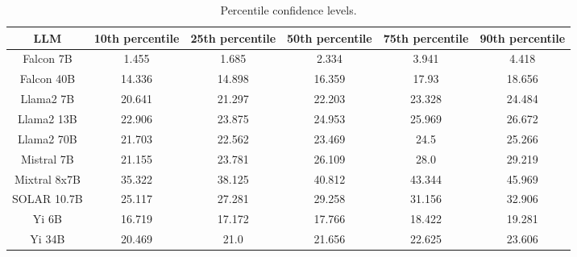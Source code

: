 \begin{table*}
\centering
\begin{tabular}{c|c|c|c|c|c}
LLM & 10th percentile & 25th percentile & 50th percentile & 75th percentile & 90th percentile\\ \hline
Falcon 7B & 1.455 & 1.685 & 2.334 & 3.941 & 4.418\\
Falcon 40B & 14.336 & 14.898 & 16.359 & 17.93 & 18.656\\
Llama2 7B & 20.641 & 21.297 & 22.203 & 23.328 & 24.484\\
Llama2 13B & 22.906 & 23.875 & 24.953 & 25.969 & 26.672\\
Llama2 70B & 21.703 & 22.562 & 23.469 & 24.5 & 25.266\\
Mistral 7B & 21.155 & 23.781 & 26.109 & 28.0 & 29.219\\
Mixtral 8x7B & 35.322 & 38.125 & 40.812 & 43.344 & 45.969\\
SOLAR 10.7B & 25.117 & 27.281 & 29.258 & 31.156 & 32.906\\
Yi 6B & 16.719 & 17.172 & 17.766 & 18.422 & 19.281\\
Yi 34B & 20.469 & 21.0 & 21.656 & 22.625 & 23.606\\
\hline
\end{tabular}
\caption{Percentile confidence levels.}
\label{tab:percentile_conf}
\end{table*}
